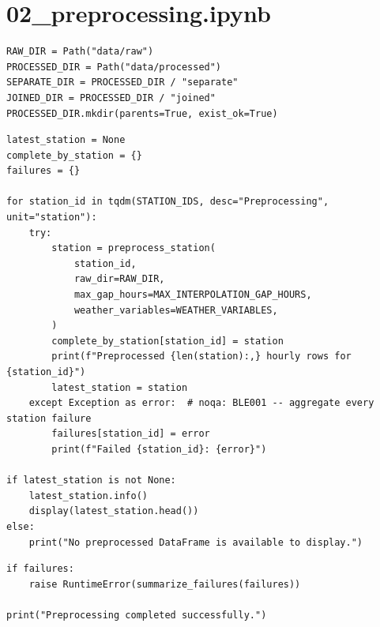 \section{02\_preprocessing.ipynb}

\begin{verbatim}
RAW_DIR = Path("data/raw")
PROCESSED_DIR = Path("data/processed")
SEPARATE_DIR = PROCESSED_DIR / "separate"
JOINED_DIR = PROCESSED_DIR / "joined"
PROCESSED_DIR.mkdir(parents=True, exist_ok=True)
\end{verbatim}

\begin{verbatim}
latest_station = None
complete_by_station = {}
failures = {}

for station_id in tqdm(STATION_IDS, desc="Preprocessing", unit="station"):
    try:
        station = preprocess_station(
            station_id,
            raw_dir=RAW_DIR,
            max_gap_hours=MAX_INTERPOLATION_GAP_HOURS,
            weather_variables=WEATHER_VARIABLES,
        )
        complete_by_station[station_id] = station
        print(f"Preprocessed {len(station):,} hourly rows for {station_id}")
        latest_station = station
    except Exception as error:  # noqa: BLE001 -- aggregate every station failure
        failures[station_id] = error
        print(f"Failed {station_id}: {error}")

if latest_station is not None:
    latest_station.info()
    display(latest_station.head())
else:
    print("No preprocessed DataFrame is available to display.")
\end{verbatim}

\begin{verbatim}
if failures:
    raise RuntimeError(summarize_failures(failures))

print("Preprocessing completed successfully.")
\end{verbatim}

